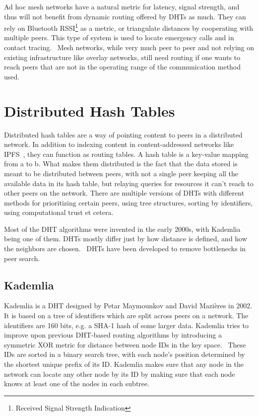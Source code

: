 Ad hoc mesh networks have a natural metric for latency, signal strength, and thus will not benefit from dynamic routing offered by DHTs as much. They can rely on Bluetooth RSSI\footnote{Received Signal Strength Indication} as a metric, or triangulate distances by cooperating with multiple peers. This type of system is used to locate emergency calls and in contact tracing.~\cite{Biddle2020-kl} Mesh networks, while very much peer to peer and not relying on existing infrastructure like overlay networks, still need routing if one wants to reach peers that are not in the operating range of the communication method used. 

\section{Distributed Hash Tables}
Distributed hash tables are a way of pointing content to peers in a distributed network. In addition to indexing content in content-addressed networks like IPFS~\cite{Labs_undated-uw}, they can function as routing tables. A hash table is a key-value mapping from a to b. What makes them distributed is the fact that the data stored is meant to be distributed between peers, with not a single peer keeping all the available data in its hash table, but relaying queries for resources it can't reach to other peers on the network. There are multiple versions of DHTs with different methods for prioritizing certain peers, using tree structures, sorting by identifiers, using computational trust et cetera.

Most of the DHT algorithms were invented in the early 2000s, with Kademlia being one of them. DHTs mostly differ just by how distance is defined, and how the neighbors are chosen.~\cite{Cai2015-ra} DHTs have been developed to remove bottlenecks in peer search.
						
\subsection{Kademlia}
Kademlia is a DHT designed by Petar Maymounkov and David Mazières in 2002. It is based on a tree of identifiers which are split across peers on a network. The identifiers are 160 bits, e.g. a SHA-1 hash of some larger data. Kademlia tries to improve upon previous DHT-based routing algorithms by introducing a symmetric XOR metric for distance between node IDs in the key space.~\cite{Petar_Maymounkov2020-sx} These IDs are sorted in a binary search tree, with each node's position determined by the shortest unique prefix of its ID. Kademlia makes sure that any node in the network can locate any other node by its ID by making sure that each node knows at least one of the nodes in each subtree.
						

